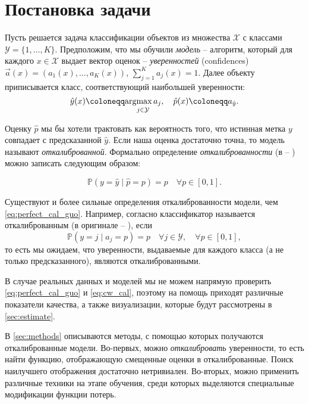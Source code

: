 \documentclass[12pt]{article}
\begin{document}
\section{Постановка задачи}

Пусть решается задача классификации объектов из множества $\mathcal{X}$ с классами ${\mathcal{Y}}=\{1,\dots,K\}$. Предположим, что мы обучили \emph{модель} -- алгоритм, который для каждого $x\in{\mathcal{X}}$ выдает вектор оценок -- \emph{уверенностей} (confidences) $\vec{a}(x)=(a_1(x),\dots,a_K(x))$, $\sum_{j=1}^{K}a_j(x)=1$. Далее объекту приписывается класс, соответствующий наибольшей уверенности: 
\begin{equation*}\hat{y}(x)\coloneqq\underset{j\in \mathcal{Y}}{\argmax{a_j}},\quad \hat{p}(x)\coloneqq a_{\hat{y}}.
\end{equation*}

Оценку $\hat{p}$ мы бы хотели трактовать как вероятность того, что истинная метка $y$ совпадает с предсказанной $\hat{y}$. Если наша оценка достаточно точна, то модель называют \emph{откалиброванной}. Формально определение \emph{откалиброванности} (в \cite{on_cal} -- ) можно записать следующим образом:

\begin{equation}\label{eq:perfect_cal_guo}
    \mathbb{P}\left(y=\hat{y}\mid \hat{p}=p\right)=p \quad \forall p\in\left[0, 1\right].
\end{equation}

Существуют и более сильные определения откалиброванности модели, чем \eqref{eq:perfect_cal_guo}. Например, согласно \cite{isotonic} классификатор называется откалиброванным (в оригинале -- ), если 
\begin{equation}\label{eq:cw_cal}
    \mathbb{P}(y=j\mid a_j=p) = p \quad \forall j\in\mathcal{Y}, \quad \forall p\in \left[0, 1\right],
\end{equation}
то есть мы ожидаем, что уверенности, выдаваемые для каждого класса (а не только предсказанного), являются откалиброванными. 

В случае реальных данных и моделей мы не можем напрямую проверить \eqref{eq:perfect_cal_guo} и \eqref{eq:cw_cal}, поэтому на помощь приходят различные показатели качества, а также визуализации, которые будут рассмотрены в \autoref{sec:estimate}.

В \autoref{sec:methods} описываются методы, с помощью которых получаются откалиброванные модели. Во-первых, можно \emph{откалибровать} уверенности, то есть найти функцию, отображающую смещенные оценки в откалиброванные. Поиск наилучшего отображения достаточно нетривиален. Во-вторых, можно применить различные техники на этапе обучения, среди которых выделяются специальные модификации функции потерь.
\end{document}
